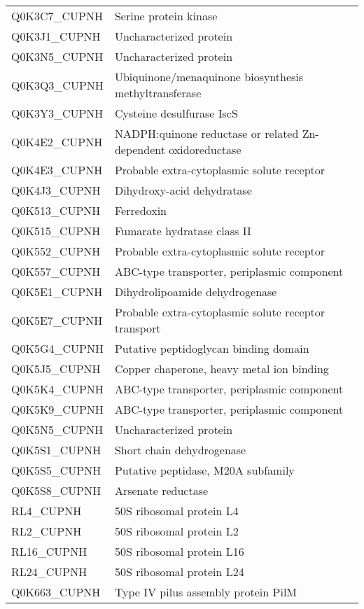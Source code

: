 \begin{center}
\begin{longtable}{ l l }
Q0K3C7\_CUPNH & Serine protein kinase \\ [0.5ex]
Q0K3J1\_CUPNH & Uncharacterized protein \\ [0.5ex]
Q0K3N5\_CUPNH & Uncharacterized protein \\ [0.5ex]
Q0K3Q3\_CUPNH & Ubiquinone/menaquinone biosynthesis methyltransferase \\ [0.5ex]
Q0K3Y3\_CUPNH & Cysteine desulfurase IscS \\ [0.5ex]
Q0K4E2\_CUPNH & NADPH:quinone reductase or related Zn-dependent oxidoreductase \\ [0.5ex]
Q0K4E3\_CUPNH & Probable extra-cytoplasmic solute receptor \\ [0.5ex]
Q0K4J3\_CUPNH & Dihydroxy-acid dehydratase \\ [0.5ex]
Q0K513\_CUPNH & Ferredoxin \\ [0.5ex]
Q0K515\_CUPNH & Fumarate hydratase class II \\ [0.5ex]
Q0K552\_CUPNH & Probable extra-cytoplasmic solute receptor \\ [0.5ex]
Q0K557\_CUPNH & ABC-type transporter, periplasmic component \\ [0.5ex]
Q0K5E1\_CUPNH & Dihydrolipoamide dehydrogenase \\ [0.5ex]
Q0K5E7\_CUPNH & Probable extra-cytoplasmic solute receptor transport \\ [0.5ex]
Q0K5G4\_CUPNH & Putative peptidoglycan binding domain \\ [0.5ex]
Q0K5J5\_CUPNH & Copper chaperone, heavy metal ion binding \\ [0.5ex]
Q0K5K4\_CUPNH & ABC-type transporter, periplasmic component \\ [0.5ex]
Q0K5K9\_CUPNH & ABC-type transporter, periplasmic component \\ [0.5ex]
Q0K5N5\_CUPNH & Uncharacterized protein \\ [0.5ex]
Q0K5S1\_CUPNH & Short chain dehydrogenase \\ [0.5ex]
Q0K5S5\_CUPNH & Putative peptidase, M20A subfamily \\ [0.5ex]
Q0K5S8\_CUPNH & Arsenate reductase \\ [0.5ex]
RL4\_CUPNH & 50S ribosomal protein L4 \\ [0.5ex]
RL2\_CUPNH & 50S ribosomal protein L2 \\ [0.5ex]
RL16\_CUPNH & 50S ribosomal protein L16 \\ [0.5ex]
RL24\_CUPNH & 50S ribosomal protein L24 \\ [0.5ex]
Q0K663\_CUPNH & Type IV pilus assembly protein PilM \\ [0.5ex]

\end{longtable}
\end{center}
